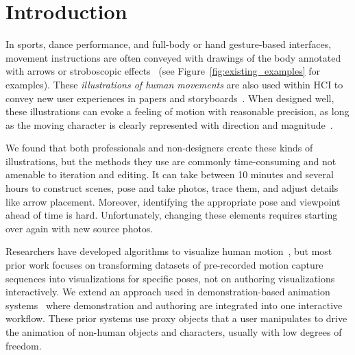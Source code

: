 
 \section{Introduction}

In sports, dance performance,
and full-body or hand gesture-based interfaces, movement instructions are often conveyed with drawings of the body annotated with arrows or stroboscopic effects~\cite{cutting_representing_2002} (see Figure~\ref{fig:existing_examples} for examples).
These \textit{illustrations of human movements} are also used within HCI to convey new user experiences in papers and storyboards~\cite{Buxton:2007:SUE:1526229}.
When designed well, these illustrations can evoke a feeling of motion with reasonable precision, as long as the moving character is clearly represented with direction and magnitude~\cite{cutting_representing_2002}.

We found that both professionals and non-designers
create these kinds of illustrations, but the methods they use are commonly time-consuming and not amenable to iteration and editing.
It can take between 10 minutes and several hours to construct scenes, pose and take photos, trace them, and adjust details like arrow placement. Moreover, identifying the appropriate pose and viewpoint ahead of time is hard. Unfortunately, changing these elements requires starting over again with new source photos.

Researchers have developed algorithms to visualize human motion~\cite{bouvier2007motion,choi2012retrieval,assa2005action,assa2008motion}, but most prior work focuses on transforming datasets of pre-recorded motion capture sequences into visualizations for specific poses, not on authoring visualizations interactively.
We extend an approach used in demonstration-based animation systems~\cite{Barnes:2008:VideoPuppetry,held20123d,Gupta:2014:MotionMontage} where demonstration and authoring are integrated into one interactive workflow.
%
These prior systems use proxy objects that a user manipulates to drive the animation of non-human objects and characters, usually with low degrees of freedom.
%

